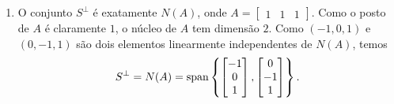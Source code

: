 \documentclass[leqno]{article}
\begin{document}
\begin{enumerate}
\begin{sol}
\begin{enumerate}
		\item O conjunto \( S^{ \perp } \) é exatamente \( N ( A ) \), onde \( A = 
            \begin{bmatrix}
                1 & 1 & 1 
		    \end{bmatrix} \).
            Como o posto de \( A \) é claramente \( 1 \), o núcleo de \( A \) tem dimensão \( 2 \).
            Como \( ( -1, 0, 1 ) \) e \( ( 0, -1, 1 ) \) são dois elementos linearmente independentes de \( N ( A ) \), temos
            \begin{equation*}
                S^{ \perp } = N ( A ) =
                \operatorname{span}
                \left\{ 
                    \begin{bmatrix}
                        -1 \\
                        0 \\
                        1
                    \end{bmatrix},
                    \begin{bmatrix}
                        0 \\
                        -1 \\
                        1
                    \end{bmatrix}
                \right\}
            .\end{equation*}


\end{enumerate}
\end{sol}
\end{enumerate}
\end{document}
